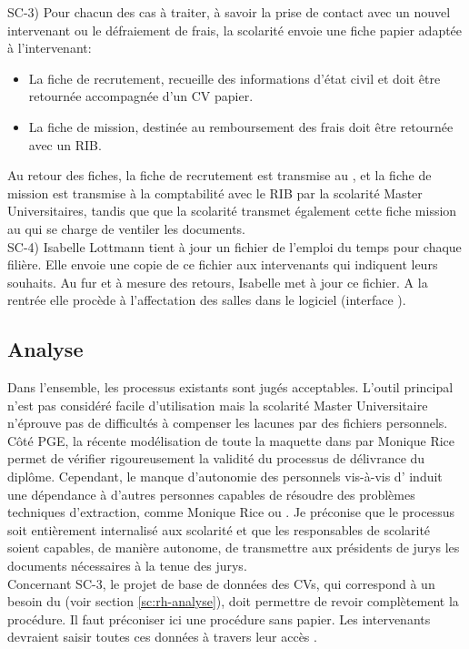 \documentclass{book}
\begin{document}
SC-3) Pour chacun des cas à traiter, à savoir la prise de contact
avec un nouvel intervenant ou le défraiement de frais,
la scolarité envoie une fiche papier adaptée à l'intervenant:
\begin{itemize}
\item La fiche de recrutement, recueille des informations d'état 
civil et doit être retournée accompagnée d'un CV papier. 
\item 
La fiche de mission, destinée au remboursement des frais doit 
être retournée avec un RIB. 
\end{itemize}
Au retour des fiches, la fiche de recrutement est transmise 
au \srh, et la fiche de mission est transmise à la comptabilité
avec le RIB par la scolarité Master Universitaires, tandis que
que la scolarité transmet également cette fiche mission au \srh
qui se charge de ventiler les documents.\\

SC-4) Isabelle Lottmann tient à jour un fichier  de 
l'emploi du temps pour chaque filière. Elle envoie une copie de ce 
fichier aux intervenants qui indiquent leurs souhaits. Au fur et
à mesure des retours, Isabelle met à jour ce fichier. A la rentrée
elle procède à l'affectation des salles dans le logiciel 
(interface ).


\subsection{Analyse}

Dans l'ensemble, les processus existants sont jugés acceptables.
L'outil principal  n'est pas considéré facile 
d'utilisation mais la scolarité Master Universitaire n'éprouve
pas de difficultés à compenser les lacunes par des fichiers 
 personnels. Côté PGE, la récente modélisation 
de toute la maquette dans  par Monique Rice permet 
de vérifier rigoureusement la validité du processus de délivrance 
du diplôme.
Cependant, le manque d'autonomie des personnels vis-à-vis
d' induit une dépendance à d'autres personnes
capables de résoudre des problèmes techniques d'extraction,
comme Monique Rice ou \CK. Je préconise que le processus
soit entièrement internalisé aux scolarité et que les 
responsables de scolarité soient capables, de manière autonome,
de transmettre aux présidents de jurys les documents nécessaires 
à la tenue des jurys.\\

Concernant SC-3, le projet de base de données des CVs, qui 
correspond à un besoin du \srh (voir section \ref{sc:rh-analyse}),
doit permettre de revoir complètement la procédure. Il faut
préconiser ici une procédure sans papier. Les intervenants
devraient saisir toutes ces données à travers leur accès 
.
\end{document}
